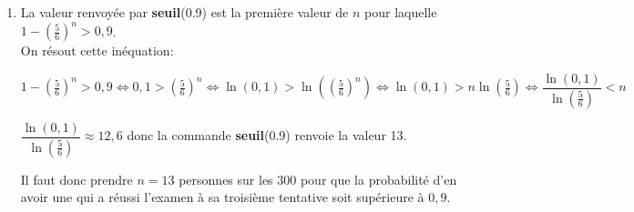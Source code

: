 \documentclass[10pt]{article}
\begin{document}
\begin{enumerate}
\begin{enumerate}
		\item 
La valeur renvoyée par \textbf{seuil}(0.9) est la première valeur de $n$ pour laquelle $1-\left (\frac{5}{6}\right )^n >0,9$. \\
On résout cette inéquation:
		
$1-\left (\frac{5}{6}\right )^n >0,9
\iff 
0,1 > \left (\frac{5}{6}\right )^n
\iff
\ln(0,1) > \ln\left (\left (\frac{5}{6}\right )^n\right )
\iff
\ln(0,1) > n\ln\left (\frac{5}{6}\right )
\iff
\dfrac{\ln(0,1)}{\ln\left (\frac{5}{6}\right )} < n
$		

$\dfrac{\ln(0,1)}{\ln\left (\frac{5}{6}\right )}\approx 12,6$ donc la commande \textbf{seuil}(0.9) renvoie la valeur 13.

Il faut donc prendre $n=13$ personnes sur les 300 pour que la probabilité d'en avoir une qui a réussi l'examen à sa troisième tentative soit supérieure à $0,9$.
		
		
	\end{enumerate}
\end{enumerate}
\end{document}
